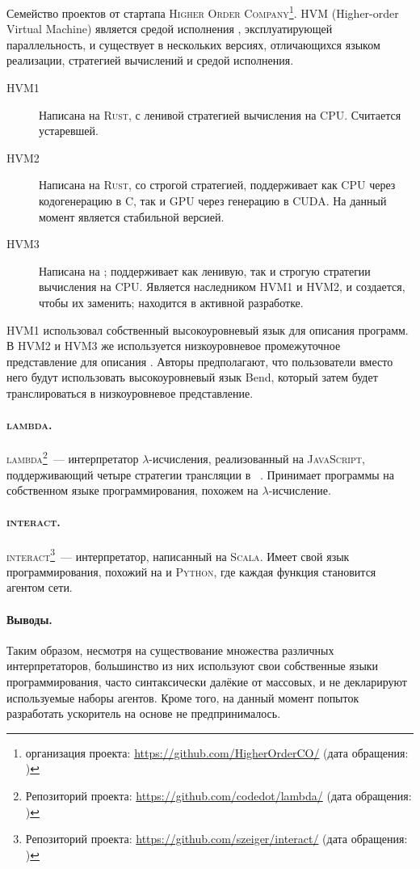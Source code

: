 Семейство проектов от стартапа \textsc{Higher Order Company}\footnote{\GitHub{} организация проекта: \url{https://github.com/HigherOrderCO/} (дата обращения: )}.
HVM (Higher-order Virtual Machine) является средой исполнения \INs{}, эксплуатирующей параллельность, и существует в нескольких версиях, отличающихся языком реализации, стратегией вычислений и средой исполнения.
\begin{description}
      \item[HVM1] Написана на \textsc{Rust}, с ленивой стратегией вычисления на CPU.
            Считается устаревшей.
      \item[HVM2] Написана на \textsc{Rust}, со строгой стратегией, поддерживает как CPU через кодогенерацию в C, так и GPU через генерацию в CUDA.
            На данный момент является стабильной версией.
      \item[HVM3] Написана на \Haskell{}; поддерживает как ленивую, так и строгую стратегии вычисления на CPU.
            Является наследником HVM1 и HVM2, и создается, чтобы их заменить; находится в активной разработке.
\end{description}
HVM1 использовал собственный высокоуровневый язык для описания программ.
В HVM2 и HVM3 же используется низкоуровневое промежуточное представление для описания \INs{}.
Авторы предполагают, что пользователи вместо него будут использовать высокоуровневый язык Bend, который затем будет транслироваться в низкоуровневое представление.

\paragraph{\textsc{lambda}.}

\textsc{lambda}\footnote{Репозиторий проекта: \url{https://github.com/codedot/lambda/} (дата обращения: )}~--- интерпретатор $\lambda$-исчисления, реализованный на \textsc{JavaScript}, поддерживающий четыре стратегии трансляции в \INs{}~\cite{salikhmetovTokenpassingOptimalReduction2016}.
Принимает программы на собственном языке программирования, похожем на $\lambda$-исчисление.

\paragraph{\textsc{interact}.}

\textsc{interact}\footnote{Репозиторий проекта: \url{https://github.com/szeiger/interact/} (дата обращения: )}~--- интерпретатор, написанный на \textsc{Scala}.
Имеет свой язык программирования, похожий на \OCaml{} и \textsc{Python}, где каждая функция становится агентом сети.

\paragraph{Выводы.}

Таким образом, несмотря на существование множества различных интерпретаторов, большинство из них используют свои собственные языки программирования, часто синтаксически далёкие от массовых, и не декларируют используемые наборы агентов.
Кроме того, на данный момент попыток разработать ускоритель на основе \INs{} не предпринималось.
